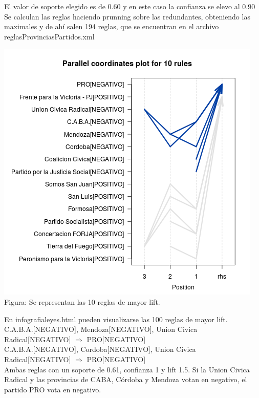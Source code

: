 \documentclass{endm}
\begin{document}
El valor de soporte elegido es de 0.60 y en este caso la confianza se elevo al 0.90\\

Se calculan las reglas haciendo prunning sobre las redundantes, obteniendo las maximales y de ahí salen 194 reglas, que se encuentran en el archivo reglasProvinciasPartidos.xml \\


\begin{center}
\includegraphics[scale=0.4]{graficos/paracoordProvinciasPartidos.png} \\
\scriptsize{Figura: Se representan las 10 reglas de mayor lift.}
\end{center} 

En infografialeyes.html pueden visualizarse las 100 reglas de mayor lift. \\

{C.A.B.A.[NEGATIVO],        
Mendoza[NEGATIVO], 
Union Civica Radical[NEGATIVO]} $\Longrightarrow$ {PRO[NEGATIVO]} \\

{C.A.B.A.[NEGATIVO],                  Cordoba[NEGATIVO],  Union Civica Radical[NEGATIVO]}  $\Longrightarrow$ {PRO[NEGATIVO]}\\

Ambas reglas con un soporte de 0.61, confianza 1 y lift 1.5. Si la Union Civica Radical y las provincias de CABA, Córdoba y Mendoza votan en negativo, el partido PRO vota en negativo.\\
\end{document}
